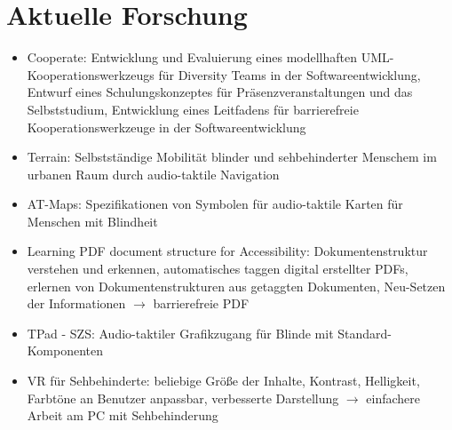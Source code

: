 \documentclass[paper=a4, fontsize=11pt]{scrartcl} %
\numberwithin{equation}{section} %
\numberwithin{figure}{section} %
\numberwithin{table}{section} %
\begin{document}
\section{Aktuelle Forschung}

\begin{itemize}
\item Cooperate: Entwicklung und Evaluierung eines modellhaften UML-Kooperationswerkzeugs für Diversity Teams in der Softwareentwicklung, Entwurf eines Schulungskonzeptes für Präsenzveranstaltungen und das Selbststudium, Entwicklung eines Leitfadens für barrierefreie Kooperationswerkzeuge in der Softwareentwicklung
\item Terrain: Selbstständige Mobilität blinder und sehbehinderter Menschem im urbanen Raum durch audio-taktile Navigation
\item AT-Maps: Spezifikationen von Symbolen für audio-taktile Karten für Menschen mit Blindheit
\item Learning PDF document structure for Accessibility: Dokumentenstruktur verstehen und erkennen, automatisches taggen digital erstellter PDFs, erlernen von Dokumentenstrukturen aus getaggten Dokumenten, Neu-Setzen der Informationen $\rightarrow$ barrierefreie PDF
\item TPad - SZS: Audio-taktiler Grafikzugang für Blinde mit Standard-Komponenten
\item VR für Sehbehinderte: beliebige Größe der Inhalte, Kontrast, Helligkeit, Farbtöne an Benutzer anpassbar, verbesserte Darstellung $\rightarrow$ einfachere Arbeit am PC mit Sehbehinderung
\end{itemize}
\end{document}

